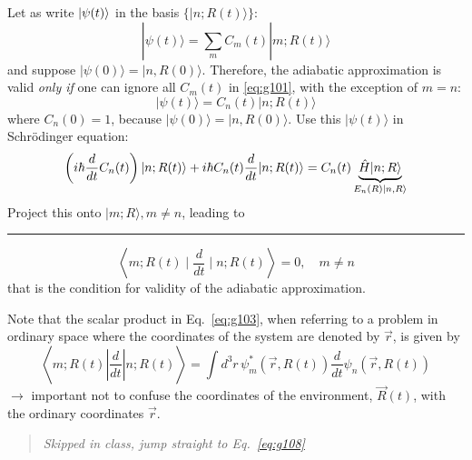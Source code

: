 \documentclass[12pt]{article}
\newcommand{\be}{\begin{equation}}
\newcommand{\ee}{\end{equation}}
\begin{document}
Let as write $\ket{\psi(t)}$ in the basis $\{|n ; R(t)\rangle\}$:
\be
|\psi(t)\rangle=\sum_{m} C_{m}(t)|m ; R(t)\rangle
\label{eq:g101}
\ee
and suppose $|\psi(0)\rangle=|n, R(0)\rangle$. Therefore, the
adiabatic approximation is valid \textit{only if} one
can ignore all $C_m(t)$ in \eqref{eq:g101}, with the exception
of $m=n$:
\be
|\psi(t)\rangle=C_{n}(t)|n ; R(t)\rangle
\ee
where $C_n(0)=1$, because $|\psi(0)\rangle=|n, R(0)\rangle$.
Use this $|\psi(t)\rangle$ in Schrödinger equation:%
\[
\left(i \hbar \frac{d}{d t} C_{n}(t)\right)
|n ; R(t)\rangle+i \hbar C_{n}(t) \frac{d}{d t}|n ; R(t)\rangle=
C_{n}(t) \underbrace{\hat{H}|n ; R\rangle}%
_{E_n(R)\ket{n,R}}
\]
Project this onto $|m ; R\rangle, m \neq n$,
leading to\\
\rule{\textwidth}{1pt}
\be
\left\langle m ; R(t) \mid \frac{d}{d t} \mid n ; R(t)\right\rangle=0, \quad m \neq n
\label{eq:g103}
\ee
that is the condition for validity of the adiabatic approximation.

Note that the scalar product in Eq.~\eqref{eq:g103}, when
referring to a problem in ordinary space where
the coordinates of the system are denoted by $\vec{r}$,
is given by
\be
\left\langle m ; R(t)\left|\frac{d}{d t}\right| n ; R(t)\right\rangle=\int d^{3} r\, \psi_{m}^{*}(\vec{r}, R(t)) \frac{d}{d t} \psi_{n}(\vec{r}, R(t))
\ee
$\rightarrow$
important not to confuse the
coordinates of the environment, $\vec{R}(t)$,
with the ordinary coordinates $\vec{r}$.

\begin{quote}\emph{Skipped in class, jump straight to Eq.~\eqref{eq:g108}}\end{quote}
\end{document}
